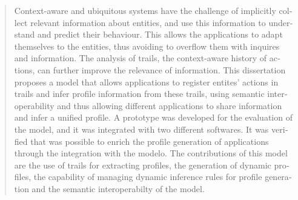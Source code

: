 % 
%
\begin{otherlanguage}{english}
\begin{abstract}
Context-aware and ubiquitous systems have the challenge of implicitly collect relevant information about entities, and use this information to understand and predict their behaviour. This allows the applications to adapt themselves to the entities, thus avoiding to overflow them with inquires and information. The analysis of trails, the context-aware history of actions, can further improve the relevance of information. This dissertation proposes a model that allows applications to register entites' actions in trails and infer profile information from these trails, using semantic interoperability and thus allowing different applications to share information and infer a unified profile. A prototype was developed for the evaluation of the model, and it was integrated with two different softwares. It was verified that was possible to enrich the profile generation of applications through the integration with the modelo. The contributions of this model are the use of trails for extracting profiles, the generation of dynamic profiles, the capability of managing dynamic inference rules for profile generation and the semantic interoperabilty of the model.  
\end{abstract}
\end{otherlanguage}

%
% 
\listoffigures

%
%
\listoftables

% 
% 
\tableofcontents
